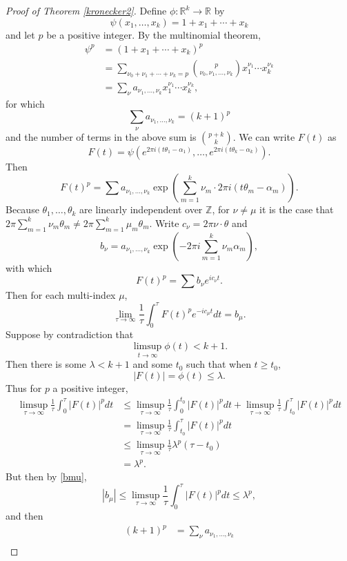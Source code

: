 \documentclass{article}
\theoremstyle{definition}
\begin{document}
\begin{proof}[Proof of Theorem \ref{kronecker2}]
Define $\phi:\mathbb{R}^k \to \mathbb{R}$ by
\[
\psi(x_1,\ldots,x_k) = 1 + x_1 + \cdots + x_k
\]
and let $p$ be a positive integer. 
By the multinomial theorem,
\begin{align*}
\psi^p &= (1 + x_1 + \cdots + x_k)^p\\
& = \sum_{\nu_0+\nu_1+\cdots+\nu_k = p}
\binom{p}{\nu_0,\nu_1,\ldots,\nu_k}  x_1^{\nu_1} \cdots x_k^{\nu_k}\\
&=\sum_\nu a_{\nu_1,\ldots,\nu_k}  x_1^{\nu_1} \cdots x_k^{\nu_k},
\end{align*}
for which
\[
\sum_\nu a_{\nu_1,\ldots,\nu_k} = (k+1)^p
\]
and the number of terms in the above sum is $\binom{p+k}{k}$. 
We can write $F(t)$ as
\[
F(t) = \psi(e^{2\pi i(t\theta_1-\alpha_1)},\ldots,e^{2\pi i(t\theta_k-\alpha_k)}).
\]
Then
\[
F(t)^p = \sum a_{\nu_1,\ldots,\nu_k} \exp\left( \sum_{m=1}^k \nu_m \cdot 2\pi i(t\theta_m-\alpha_m)\right).
\]
Because $\theta_1,\ldots,\theta_k$ are linearly independent over $\mathbb{Z}$, for $\nu \neq \mu$ it is the case
that $2\pi \sum_{m=1}^k \nu_m \theta_m \neq 2\pi \sum_{m=1}^k \mu_m \theta_m$. Write
$c_\nu = 2\pi \nu \cdot \theta$ 
and
\[
b_\nu = a_{\nu_1,\ldots,\nu_k} \exp\left(-2\pi i \sum_{m=1}^k \nu_m \alpha_m\right),
\]
with which
\[
F(t)^p = \sum b_\nu e^{i c_\nu t}.
\]
Then for each multi-index $\mu$,
\begin{equation}
\lim_{\tau \to \infty} \frac{1}{\tau} \int_0^\tau F(t)^p e^{-ic_\mu t} dt = b_\mu.
\label{bmu}
\end{equation}
Suppose by contradiction that 
\[
\limsup_{t \to \infty} \phi(t) < k+1.
\]
Then there is some $\lambda<k+1$ and some $t_0$ such that when $t \geq t_0$,
\[
|F(t)| = \phi(t) \leq \lambda.
\]
Thus for $p$ a positive integer,
\begin{align*}
\limsup_{\tau \to \infty} \frac{1}{\tau} \int_0^\tau |F(t)|^p dt & \leq
\limsup_{\tau \to \infty} \frac{1}{\tau} \int_0^{t_0} |F(t)|^p dt
+ \limsup_{\tau \to \infty} \frac{1}{\tau} \int_{t_0}^\tau |F(t)|^p dt\\
&= \limsup_{\tau \to \infty} \frac{1}{\tau} \int_{t_0}^\tau |F(t)|^p dt\\
&\leq \limsup_{\tau \to \infty} \frac{1}{\tau} \lambda^p (\tau-t_0)\\
&= \lambda^p. 
\end{align*}
But then by \eqref{bmu}, 
\[
|b_\mu| \leq \limsup_{\tau \to \infty} \frac{1}{\tau} \int_0^\tau |F(t)|^p dt
\leq \lambda^p,
\]
and then
\begin{align*}
(k+1)^p&=\sum_\nu a_{\nu_1,\ldots,\nu_k}\\

\end{align*}
\end{proof}
\end{document}
